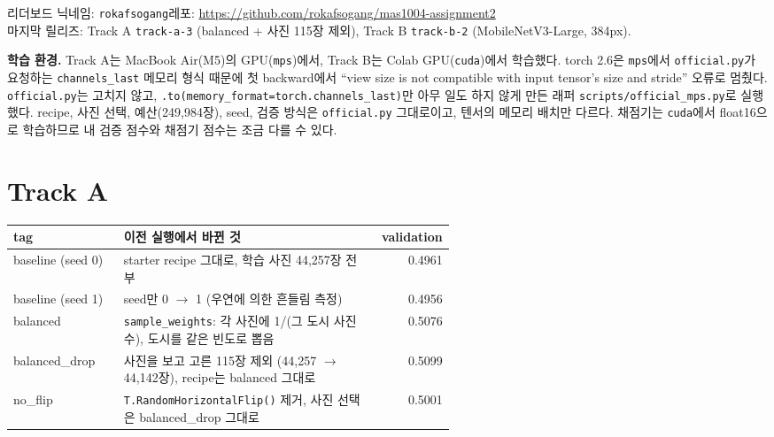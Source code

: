 \documentclass[11pt]{article}
\begin{document}
\makeheader

리더보드 닉네임: \texttt{rokafsogang}\quad 레포: \url{https://github.com/rokafsogang/mas1004-assignment2}\\
마지막 릴리즈: Track A \texttt{track-a-3} (balanced + 사진 115장 제외), Track B \texttt{track-b-2} (MobileNetV3-Large, 384px).

\textbf{학습 환경.} Track A는 MacBook Air(M5)의 GPU(\texttt{mps})에서, Track B는 Colab GPU(\texttt{cuda})에서 학습했다.
torch 2.6은 \texttt{mps}에서 \texttt{official.py}가 요청하는 \texttt{channels\_last} 메모리 형식 때문에 첫 backward에서
``view size is not compatible with input tensor's size and stride'' 오류로 멈췄다. \texttt{official.py}는 고치지 않고,
\texttt{.to(memory\_format=torch.channels\_last)}만 아무 일도 하지 않게 만든 래퍼 \texttt{scripts/official\_mps.py}로 실행했다.
recipe, 사진 선택, 예산(249,984장), seed, 검증 방식은 \texttt{official.py} 그대로이고, 텐서의 메모리 배치만 다르다.
채점기는 \texttt{cuda}에서 float16으로 학습하므로 내 검증 점수와 채점기 점수는 조금 다를 수 있다.

\section*{Track A}

\begin{center}\footnotesize
\begin{tabular}{lp{0.58\linewidth}r}
\toprule
tag & 이전 실행에서 바뀐 것 & validation \\
\midrule
baseline (seed 0) & starter recipe 그대로, 학습 사진 44,257장 전부 & 0.4961 \\
baseline (seed 1) & seed만 0 $\to$ 1 (우연에 의한 흔들림 측정) & 0.4956 \\
balanced & \texttt{sample\_weights}: 각 사진에 1/(그 도시 사진 수), 도시를 같은 빈도로 뽑음 & 0.5076 \\
balanced\_drop & 사진을 보고 고른 115장 제외 (44,257 $\to$ 44,142장), recipe는 balanced 그대로 & 0.5099 \\
no\_flip & \texttt{T.RandomHorizontalFlip()} 제거, 사진 선택은 balanced\_drop 그대로 & 0.5001 \\
\bottomrule
\end{tabular}
\end{center}
\end{document}
